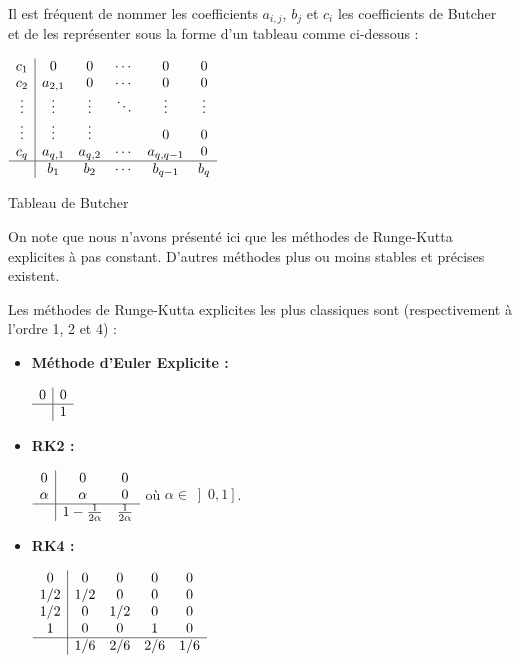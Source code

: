 \documentclass[10pt,a4paper]{amsart}
\begin{document}
Il est fréquent de nommer les coefficients $a_{i,j}$, $b_j$ et $c_i$ les coefficients de Butcher et de les représenter sous la forme d'un tableau comme ci-dessous :

\begin{table}[h!]
\begin{center}
$\begin{array}{c|ccccc}
c_1 & 0 & 0 & \cdots & 0 & 0 \\
c_2 & a_{2,1} & 0 & \cdots & 0 & 0 \\
\vdots & \vdots & \vdots & \ddots & \vdots & \vdots \\
\vdots & \vdots & \vdots &  & 0 & 0 \\
c_q & a_{q,1} & a_{q,2} & \cdots & a_{q, q-1} & 0 \\
\hline
    & b_1  & b_2 & \cdots & b_{q-1} & b_q 
\end{array}$
\caption{Tableau de Butcher}
\label{rk_butcher}
\end{center}
\end{table}

On note que nous n'avons présenté ici que les méthodes de Runge-Kutta explicites à pas constant. D'autres méthodes plus ou moins stables et précises existent.

Les méthodes de Runge-Kutta explicites les plus classiques sont (respectivement à l'ordre 1, 2 et 4) :

\begin{itemize}
\item \textbf{Méthode d'Euler Explicite :}

\begin{center}
$\begin{array}{c|c}
0 & 0 \\
\hline
  & 1 \\
\end{array}$
\end{center}

\item \textbf{RK2 : }
\begin{center}
$\begin{array}{c|cc}
0 & 0 & 0\\
\alpha & \alpha & 0 \\
\hline
  & 1-\frac{1}{2 \alpha} & \frac{1}{2 \alpha} \\
\end{array}$
\hspace{1cm} où $\alpha \in \left] 0, 1 \right]$.
\end{center}


\item \textbf{RK4 : }
\begin{center}
$\begin{array}{c|cccc}
0 & 0 & 0 & 0 & 0\\
1/2 & 1/2 & 0 & 0 & 0 \\
1/2 & 0 & 1/2 & 0 & 0 \\
1 & 0 & 0 & 1 & 0 \\
\hline
  & 1/6 & 2/6 & 2/6 & 1/6 \\
\end{array}$
\end{center}

\end{itemize}
\end{document}
